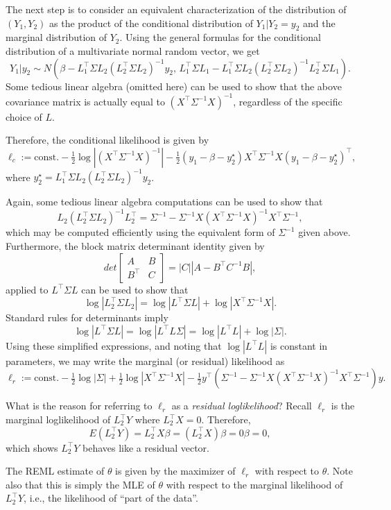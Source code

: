 \documentclass[
]{book}
\begin{document}
The next step is to consider an equivalent characterization of the distribution of \((Y_1, Y_2)\) as the product of the conditional distribution of \(Y_1|Y_2 = y_2\) and the marginal distribution of \(Y_2\). Using the general formulas for the conditional distribution of a multivariate normal random vector, we get
\[Y_1|y_2 \sim N(\beta - L_1^\top \Sigma L_2(L_2^\top \Sigma L_2)^{-1}y_2, \, L_1^\top \Sigma L_1-L_1^\top \Sigma L_2(L_2^\top \Sigma L_2)^{-1} L_2^\top \Sigma L_1).\]
Some tedious linear algebra (omitted here) can be used to show that the above covariance matrix is actually equal to \((X^\top \Sigma^{-1}X)^{-1}\), regardless of the specific choice of \(L\).

Therefore, the conditional likelihood is given by
\[\ell_c := \text{const.} - \tfrac12\log |(X^\top \Sigma^{-1}X)^{-1}| -\tfrac{1}{2}(y_1 - \beta - y_2^\star)X^\top \Sigma^{-1}X(y_1 - \beta - y_2^\star)^\top, \]
where \(y_2^\star = L_1^\top \Sigma L_2(L_2^\top \Sigma L_2)^{-1}y_2\).

Again, some tedious linear algebra computations can be used to show that
\[L_2(L_2^\top \Sigma L_2)^{-1}L_2^\top = \Sigma^{-1} - \Sigma^{-1}X(X^\top\Sigma^{-1} X)^{-1} X^\top\Sigma^{-1},\]
which may be computed efficiently using the equivalent form of \(\Sigma^{-1}\) given above. Furthermore, the block matrix determinant identity given by
\[det\begin{bmatrix}A & B\\
B^\top & C\end{bmatrix} = |C||A - B^\top C^{-1}B|,\]
applied to \(L^\top\Sigma L\) can be used to show that
\[\log |L_2^\top \Sigma L_2| = \log|L^\top\Sigma L| + \log |X^\top \Sigma^{-1}X|.\]
Standard rules for determinants imply
\[\log|L^\top\Sigma L| = \log|L^\top L\Sigma| = \log|L^\top L|+\log|\Sigma|.\]
Using these simplified expressions, and noting that \(\log|L^\top L|\) is constant in parameters, we may write the marginal (or residual) likelihood as
\[\ell_r:= \text{const}.-\tfrac12 \log |\Sigma| +\tfrac12 \log|X^\top \Sigma^{-1} X| -\tfrac12 y^\top(\Sigma^{-1} - \Sigma^{-1}X(X^\top\Sigma^{-1} X)^{-1} X^\top\Sigma^{-1})y.\]

What is the reason for referring to \(\ell_r\) as a \emph{residual loglikelihood}? Recall \(\ell_r\) is the marginal loglikelihood of \(L_2^\top Y\) where \(L_2^\top X = 0\). Therefore,
\[E(L_2^\top Y) = L_2^\top X\beta = (L_2^\top X)\beta = 0\beta = 0,\]
which shows \(L_2^\top Y\) behaves like a residual vector.

The REML estimate of \(\theta\) is given by the maximizer of \(\ell_r\) with respect to \(\theta\). Note also that this is simply the MLE of \(\theta\) with respect to the marginal likelihood of \(L_2^\top Y\), i.e., the likelihood of ``part of the data''.
\end{document}
